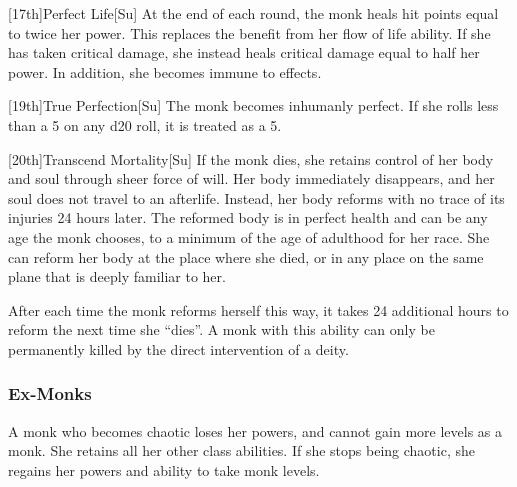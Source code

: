         [17th]{Perfect Life}[Su]
        At the end of each round, the monk heals hit points equal to twice her \ki power.
        This replaces the benefit from her flow of life ability.
        If she has taken critical damage, she instead heals critical damage equal to half her \ki power.
        In addition, she becomes immune to  effects.

        [19th]{True Perfection}[Su]
        The monk becomes inhumanly perfect.
        If she rolls less than a 5 on any d20 roll, it is treated as a 5.

        [20th]{Transcend Mortality}[Su]
        If the monk dies, she retains control of her body and soul through sheer force of will.
        Her body immediately disappears, and her soul does not travel to an afterlife.
        Instead, her body reforms with no trace of its injuries 24 hours later.
        The reformed body is in perfect health and can be any age the monk chooses, to a minimum of the age of adulthood for her race.
        She can reform her body at the place where she died, or in any place on the same plane that is deeply familiar to her.

        After each time the monk reforms herself this way, it takes 24 additional hours to reform the next time she ``dies''.
        A monk with this ability can only be permanently killed by the direct intervention of a deity.

        \subsubsection{Ex-Monks}
            A monk who becomes chaotic loses her \ki powers, and cannot gain more levels as a monk.
            She retains all her other class abilities.
            If she stops being chaotic, she regains her \ki powers and ability to take monk levels.


